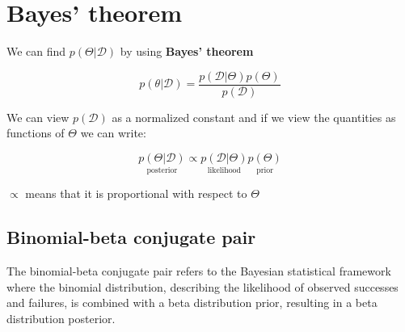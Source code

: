 \section{Bayes' theorem}
We can find $p (\Theta|\mathcal{D})$ by using \textbf{Bayes' theorem}

\begin{equation}
    p (\theta|\mathcal{D}) = \frac{p (\mathcal{D}|\Theta)p(\Theta)} {p(\mathcal{D})} 
\end{equation}

We can view $p(\mathcal{D})$ as a normalized constant and if we view the quantities as functions
of $\Theta$ we can write:

\begin{equation}
    \underset{\text{posterior}}{p (\Theta|\mathcal{D})}  \propto \underset{\text{likelihood}}{p (\mathcal{D}|\Theta)} \underset{\text{prior}}{p(\Theta)}
\end{equation}  


$\propto$ means that it is proportional with respect to $\Theta$

\subsection*{Binomial-beta conjugate pair}
The binomial-beta conjugate pair refers to the Bayesian statistical framework where the binomial distribution, describing the likelihood of observed successes and failures, is combined with a beta distribution prior, resulting in a beta distribution posterior.

